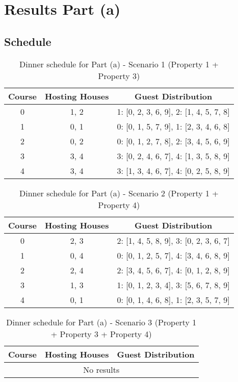 \documentclass{article}
\begin{document}
\section{Results Part (a)}

\subsection{Schedule}

\begin{table}[H]
\centering
\caption{Dinner schedule for Part (a) - Scenario 1 (Property 1 + Property 3)}
\small
\begin{tabular}{c|c|c}
\toprule
Course & Hosting Houses & Guest Distribution \\
\midrule
0 & 1, 2 & 1: [0, 2, 3, 6, 9], 2: [1, 4, 5, 7, 8] \\
1 & 0, 1 & 0: [0, 1, 5, 7, 9], 1: [2, 3, 4, 6, 8] \\
2 & 0, 2 & 0: [0, 1, 2, 7, 8], 2: [3, 4, 5, 6, 9] \\
3 & 3, 4 & 3: [0, 2, 4, 6, 7], 4: [1, 3, 5, 8, 9] \\
4 & 3, 4 & 3: [1, 3, 4, 6, 7], 4: [0, 2, 5, 8, 9] \\
\bottomrule
\end{tabular}
\end{table}

\begin{table}[H]
\centering
\caption{Dinner schedule for Part (a) - Scenario 2 (Property 1 + Property 4)}
\small
\begin{tabular}{c|c|c}
\toprule
Course & Hosting Houses & Guest Distribution \\
\midrule
0 & 2, 3 & 2: [1, 4, 5, 8, 9], 3: [0, 2, 3, 6, 7] \\
1 & 0, 4 & 0: [0, 1, 2, 5, 7], 4: [3, 4, 6, 8, 9] \\
2 & 2, 4 & 2: [3, 4, 5, 6, 7], 4: [0, 1, 2, 8, 9] \\
3 & 1, 3 & 1: [0, 1, 2, 3, 4], 3: [5, 6, 7, 8, 9] \\
4 & 0, 1 & 0: [0, 1, 4, 6, 8], 1: [2, 3, 5, 7, 9] \\
\bottomrule
\end{tabular}
\end{table}

\begin{table}[H]
\centering
\caption{Dinner schedule for Part (a) - Scenario 3 (Property 1 + Property 3 + Property 4)}
\small
\begin{tabular}{c|c|c}
\toprule
Course & Hosting Houses & Guest Distribution \\
\midrule
\multicolumn{3}{c}{No results} \\
\bottomrule
\end{tabular}
\end{table}
\end{document}
